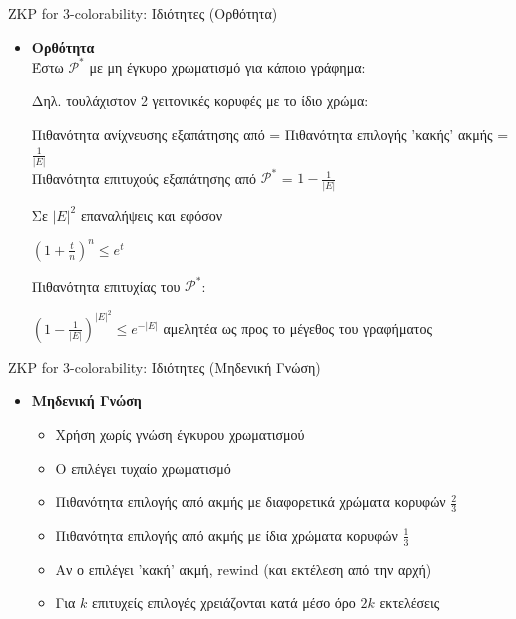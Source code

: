 \documentclass[handout]{beamer}
\begin{document}
\begin{frame}{ZKP for 3-colorability: Ιδιότητες (Ορθότητα)} 
\begin{itemize}
\item \textbf{Ορθότητα}\\
Έστω $\mathcal{P}^*$ με μη έγκυρο χρωματισμό για κάποιο γράφημα:

Δηλ. \alert{τουλάχιστον 2 γειτονικές κορυφές με το ίδιο χρώμα}:
\pause

Πιθανότητα ανίχνευσης εξαπάτησης από \ver = Πιθανότητα επιλογής 'κακής' ακμής = $\frac{1}{|E|}$  \\

Πιθανότητα επιτυχούς εξαπάτησης από $\mathcal{P}^*$ = $1-\frac{1}{|E|}$
\pause

Σε $|E|^2$ επαναλήψεις \pause και εφόσον
\begin{center}
$(1+\frac{t}{n})^n \leq e^t$
\end{center}
\pause
\medskip
Πιθανότητα επιτυχίας του  $\mathcal{P}^*$:

\begin{center}
$(1-\frac{1}{|E|})^{|E|^2} \leq e^{-|E|}$ \pause \alert{αμελητέα} ως προς το μέγεθος του γραφήματος
\end{center}

\end{itemize}
\end{frame}

\begin{frame}{ZKP for 3-colorability: Ιδιότητες (Μηδενική Γνώση)} 
\begin{itemize}
\item \textbf{Μηδενική Γνώση} 
\begin{itemize}
\item Χρήση \siml χωρίς γνώση έγκυρου χρωματισμού \pause
\item Ο \siml  επιλέγει τυχαίο χρωματισμό \pause
\item Πιθανότητα επιλογής από \ver  ακμής με διαφορετικά χρώματα κορυφών $\frac{2}{3}$ \pause
\item Πιθανότητα επιλογής από \ver  ακμής με ίδια χρώματα κορυφών  $\frac{1}{3}$ \pause
\item Αν ο \ver  επιλέγει 'κακή' ακμή, rewind (και εκτέλεση από την αρχή) \pause

\item Για $k$ επιτυχείς επιλογές χρειάζονται κατά μέσο όρο $2k$ εκτελέσεις

\end{itemize}
\end{itemize}
\end{frame}
\end{document}
